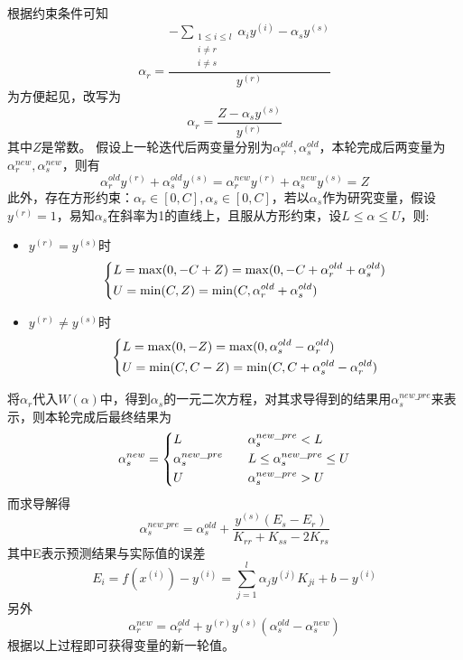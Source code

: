\documentclass[supercite]{upcthesis}
\begin{document}
根据约束条件可知
\begin{equation}
\alpha_{r}=\frac{-\sum\limits_{\substack{1 \leq i \leq l\\i \neq r\\i \neq s}}\alpha_{i}y^{(i)}-\alpha_{s}y^{(s)}}{y^{(r)}}
\end{equation}
为方便起见，改写为
\begin{equation}
\alpha_{r}=\frac{Z-\alpha_{s}y^{(s)}}{y^{(r)}}
\end{equation}
其中$Z$是常数。
假设上一轮迭代后两变量分别为$\alpha_{r}^{old},\alpha_{s}^{old}$，本轮完成后两变量为$\alpha_{r}^{new},\alpha_{s}^{new}$，则有
\begin{equation}
\alpha_{r}^{old}y^{(r)}+\alpha_{s}^{old}y^{(s)}=\alpha_{r}^{new}y^{(r)}+\alpha_{s}^{new}y^{(s)}=Z
\end{equation}
此外，存在方形约束：$\alpha_{r} \in [0,C],\alpha_{s} \in [0,C]$，若以$\alpha_{s}$作为研究变量，假设$y^{(r)}=1$，易知$\alpha_{s}$在斜率为1的直线上，且服从方形约束，设$L \leq \alpha \leq U$，则:
\begin{itemize}
\item   $y^{(r)} = y^{(s)}$时
\begin{equation}
\begin{dcases}
L=\max(0,-C+Z)=\max(0,-C+\alpha_{r}^{old}+\alpha_{s}^{old})\\
U=\min(C,Z)=\min(C,\alpha_{r}^{old}+\alpha_{s}^{old})
\end{dcases}
\end{equation}
\item   $y^{(r)} \neq y^{(s)}$时
\begin{equation}
\begin{dcases}
L=\max(0,-Z)=\max(0,\alpha_{s}^{old}-\alpha_{r}^{old})\\
U=\min(C,C-Z)=\min(C,C+\alpha_{s}^{old}-\alpha_{r}^{old})
\end{dcases}
\end{equation}
\end{itemize}
将$\alpha_{r}$代入$W(\alpha)$中，得到$\alpha_{s}$的一元二次方程，对其求导得到的结果用$\alpha_{s}^{new\_pre}$来表示，则本轮完成后最终结果为
\begin{equation}
\alpha_{s}^{new}=
\begin{dcases}
L \quad &\alpha_{s}^{new\_pre}<L\\
\alpha_{s}^{new\_pre} \quad&L \leq \alpha_{s}^{new\_pre} \leq U\\
U \quad&\alpha_{s}^{new\_pre}>U
\end{dcases}
\end{equation}
而求导解得
\begin{equation}
\alpha_{s}^{new\_pre}=\alpha_{s}^{old}+\frac{y^{(s)}(E_{s}-E_{r})}{K_{rr}+K_{ss}-2K_{rs}}
\end{equation}
其中E表示预测结果与实际值的误差
\begin{equation}
E_i=f(x^{(i)})-y^{(i)}=\sum_{j=1}^{l}\alpha_{j}y^{(j)}K_{ji}+b-y^{(i)}
\end{equation}
另外
\begin{equation}
\alpha_{r}^{new}=\alpha_{r}^{old}+y^{(r)}y^{(s)}(\alpha_{s}^{old}-\alpha_{s}^{new})
\end{equation}
根据以上过程即可获得变量的新一轮值。
\end{document}
